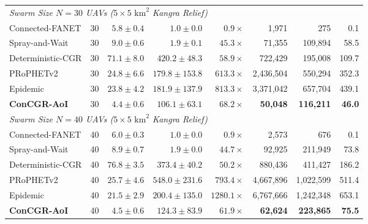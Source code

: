 \begin{table}[t]
{\begin{tabular}{lrrrrrrr}
\midrule
\multicolumn{8}{l}{\textit{Swarm Size $N = 30$ UAVs ($5\times 5\text{ km}^2$ Kangra Relief)}} \\
Connected-FANET & 30 & $5.8 \pm 0.4$ & $1.0 \pm 0.0$ & $0.9\times$ & 1,971 & 275 & 0.1 \\
Spray-and-Wait & 30 & $9.0 \pm 0.6$ & $1.9 \pm 0.1$ & $45.3\times$ & 71,355 & 109,894 & 58.5 \\
Deterministic-CGR & 30 & $71.1 \pm 8.0$ & $420.2 \pm 48.3$ & $58.9\times$ & 722,429 & 195,008 & 109.7 \\
PRoPHETv2 & 30 & $24.8 \pm 6.6$ & $179.8 \pm 153.8$ & $613.3\times$ & 2,436,504 & 550,294 & 352.3 \\
Epidemic & 30 & $23.8 \pm 4.2$ & $181.9 \pm 137.9$ & $813.3\times$ & 3,371,042 & 657,704 & 439.1 \\
\textbf{ConCGR-AoI} & 30 & $\mathbf{4.4 \pm 0.6}$ & $\mathbf{106.1 \pm 63.1}$ & $\mathbf{68.2\times}$ & \textbf{50,048} & \textbf{116,211} & \textbf{46.0} \\
\midrule
\multicolumn{8}{l}{\textit{Swarm Size $N = 40$ UAVs ($5\times 5\text{ km}^2$ Kangra Relief)}} \\
Connected-FANET & 40 & $6.0 \pm 0.3$ & $1.0 \pm 0.0$ & $0.9\times$ & 2,573 & 676 & 0.1 \\
Spray-and-Wait & 40 & $8.9 \pm 0.7$ & $1.9 \pm 0.0$ & $44.7\times$ & 92,925 & 211,949 & 73.8 \\
Deterministic-CGR & 40 & $76.8 \pm 3.5$ & $373.4 \pm 40.2$ & $50.2\times$ & 880,436 & 411,427 & 186.2 \\
PRoPHETv2 & 40 & $25.7 \pm 4.6$ & $548.0 \pm 231.6$ & $793.4\times$ & 4,667,896 & 1,022,599 & 511.4 \\
Epidemic & 40 & $21.5 \pm 2.9$ & $200.4 \pm 135.0$ & $1280.1\times$ & 6,767,666 & 1,242,348 & 653.1 \\
\textbf{ConCGR-AoI} & 40 & $\mathbf{4.5 \pm 0.6}$ & $\mathbf{124.3 \pm 83.9}$ & $\mathbf{61.9\times}$ & \textbf{62,624} & \textbf{223,865} & \textbf{75.5} \\
\bottomrule
\end{tabular}%
}
\end{table}

